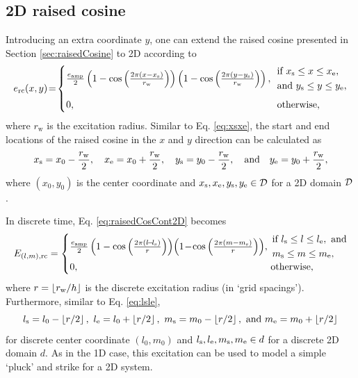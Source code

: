 \subsection{2D raised cosine}\label{sec:2DraisedCos}
Introducing an extra coordinate $y$, one can extend the raised cosine presented in Section \ref{sec:raisedCosine} to 2D according to 
\begin{equation}\label{eq:raisedCosCont2D}
    e_\text{rc}(x,y)\! =\! 
    \begin{cases}
        \!\frac{e_\text{amp}}{2}\left(1 - \cos\left(\frac{2\pi (x - x_\stxt)}{r_\text{w}}\right)\right)\left(1 - \cos\left(\frac{2\pi (y - y_\stxt)}{r_\text{w}}\right)\right), & 
        \!\!\!\begin{aligned}
            &\text{if } x_\stxt \leq x \leq x_\etxt, \\
            &\text{and } y_\stxt \leq y \leq y_\etxt,
        \end{aligned}\\[1.25em]
        \!0, &\!\! \text{otherwise},
    \end{cases}
\end{equation}
where $r_\text{w}$ is the excitation radius. Similar to Eq. \eqref{eq:xsxe}, the start and end locations of the raised cosine in the $x$ and $y$ direction can be calculated as
\begin{equation*}
    x_{\text{s}} = x_0 - 
    \frac{r_\text{w}}{2}, \quad x_{\text{e}} = x_0 + \frac{r_\text{w}}{2}, \quad y_{\text{s}} = y_0 - 
    \frac{r_\text{w}}{2}, \quad \text{and} \quad y_{\text{e}} = y_0 + \frac{r_\text{w}}{2},
\end{equation*}
where $(x_0, y_0)$ is the center coordinate and $x_{\text{s}}, x_{\text{e}}, y_{\text{s}},  y_\text{e}\in \mathcal{D}$ for a 2D domain $\mathcal{D}$.

In discrete time, Eq. \eqref{eq:raisedCosCont2D} becomes
\begin{equation}
    E_{(l,m), \text{rc}} = 
    \begin{cases}
        \!\frac{e_\text{amp}}{2}\left(1 - \cos\left(\frac{2\pi (l \!-\! l_\stxt)}{r}\right)\right)\!\left(1\! -\! \cos\left(\frac{2\pi (m - m_\stxt)}{r}\right)\right)\!, & \!\!\!\!
        \begin{aligned}
            &\text{if } l_\stxt \leq l \leq l_\etxt, \text{ and}\\
            & m_\stxt \leq m \leq m_\etxt,
        \end{aligned}\\
        \!0, &\!\!\!\! \text{otherwise},
    \end{cases}
\end{equation}
where $r = \floor[r_\text{w} / h]$ is the discrete excitation radius (in `grid spacings'). Furthermore, similar to Eq. \eqref{eq:lsle},
\begin{equation}
    l_\text{s} = l_0 - \floor[r/2],\ l_\etxt = l_0 + \floor[r/2],\ m_\text{s} = m_0 - \floor[r/2], \ \text{and} \ m_\etxt = m_0 + \floor[r/2]
\end{equation}
for discrete center coordinate $(l_0, m_0)$ and $l_{\text{s}}, l_{\text{e}}, m_{\text{s}},  m_\text{e}\in d$ for a discrete 2D domain $d$. 
As in the 1D case, this excitation can be used to model a simple `pluck' and strike for a 2D system. 

